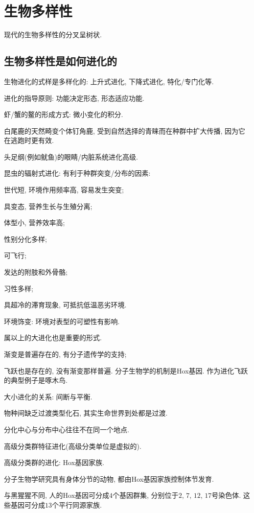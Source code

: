 \documentclass{ctexart}
\begin{document}
\section{生物多样性} %
\label{sec:生物多样性}

现代的生物多样性的分叉呈树状.

\subsection{生物多样性是如何进化的} %
\label{sub:生物多样性是如何进化的}

生物进化的式样是多样化的: 上升式进化, 下降式进化, 特化/专门化等.
\par
进化的指导原则: 功能决定形态, 形态适应功能.
\begin{ex}
    虾/蟹的鳌的形成方式: 微小变化的积分.
\end{ex}
\begin{ex}
    白尾鹿的天然畸变个体钉角鹿, 受到自然选择的青睐而在种群中扩大传播, 因为它在逃跑时更有效.
\end{ex}
\begin{ex}
    头足纲(例如鱿鱼)的眼睛/内脏系统进化高级.
\end{ex}
昆虫的辐射式进化: 有利于种群突变/分布的因素:
\begin{cenum}
    \item 世代短, 环境作用频率高, 容易发生突变;
    \item 具变态, 营养生长与生殖分离;
    \item 体型小, 营养效率高;
    \item 性别分化多样;
    \item 可飞行;
    \item 发达的附肢和外骨骼;
    \item 习性多样;
    \item 具超冷的滞育现象, 可抵抗低温恶劣环境.
\end{cenum}
环境饰变: 环境对表型的可塑性有影响.
\par
属以上的大进化也是重要的形式.
\begin{cenum}
    \item 渐变是普遍存在的, 有分子遗传学的支持;
    \item 飞跃也是存在的, 没有渐变那样普遍. 分子生物学的机制是Hox基因. 作为进化飞跃的典型例子是啄木鸟.
\end{cenum}
\par
大小进化的关系: 间断与平衡.
\begin{cenum}
    \item 物种间缺乏过渡类型化石, 其实生命世界到处都是过渡.
    \item 分化中心与分布中心往往不在同一个地点.
    \item 高级分类群特征进化(高级分类单位是虚拟的).
\end{cenum}
高级分类群的进化: Hox基因家族.
\begin{cenum}
    \item 分子生物学研究具有身体分节的动物, 都由Hox基因家族控制体节发育.
    \item 与黑猩猩不同, 人的Hox基因可分成$4$个基因群集, 分别位于$2$, $7$, $12$, $17$号染色体. 这些基因可分成$13$个平行同源家族.
\end{cenum}
\end{document}
